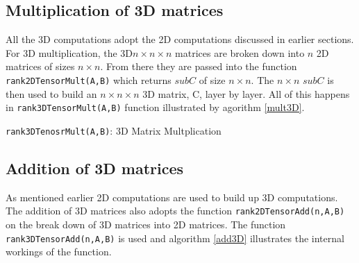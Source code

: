 \documentclass[conference]{IEEEtran}
\begin{document}

\subsection{Multiplication of 3D matrices}
All the 3D computations adopt the 2D computations discussed in earlier sections. For 3D multiplication, the 3D$n\times n\times n$ matrices are broken down into $n$ 2D matrices of sizes $n\times n$. From there they are passed into the function \texttt{rank2DTensorMult(A,B)} which returns $subC$ of size $n\times n$. The $n\times n$ $subC$ is then used to build an $n\times n\times n$ 3D matrix, C, layer by layer. All of this happens in \texttt{rank3DTensorMult(A,B)} function illustrated by agorithm \ref{mult3D}.


\linesnumbered

\begin{algorithm}

\centring



\caption{\texttt{rank3DTenosrMult(A,B)}: 3D Matrix Multplication}


\Return \C

\label{mult3D}

\end{algorithm}


 
\subsection{Addition of 3D matrices}
As mentioned earlier 2D computations are used to build up 3D computations. The addition of 3D matrices also adopts the function \texttt{rank2DTensorAdd(n,A,B)} on the break down of 3D matrices into 2D matrices. The function \texttt{rank3DTensorAdd(n,A,B)} is used and algorithm \ref{add3D} illustrates the internal workings of the function.
\end{document}
